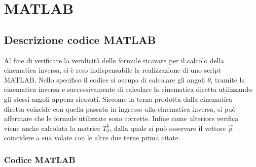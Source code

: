 \documentclass[a4paper]{article}
\begin{document}
    \newpage
    \section{MATLAB}
    
    \subsection{Descrizione codice MATLAB}
    
    \begin{text}
        Al fine di verificare la veridicità delle formule ricavate per il calcolo della cinematica inversa, si è reso indispensabile la realizzazione di uno script MATLAB. Nello specifico il codice si occupa di calcolare gli angoli $\theta_i$ tramite la cinematica inversa e successivamente di calcolare la cinematica diretta utilizzando gli stessi angoli appena ricavati. Siccome la terna prodotta dalla cinematica diretta coincide con quella passata in ingresso alla cinematica inversa, si può affermare che le formule utilizzate sono corrette.
        Infine come ulteriore verifica viene anche calcolata la matrice $T_0^5$, dalla quale si può osservare il vettore $\Vec{p}$ coincidere a sua volate con le altre due terne prima citate.  \\  
    \end{text}
    
    \subsubsection{Codice MATLAB}
    
\end{document}
